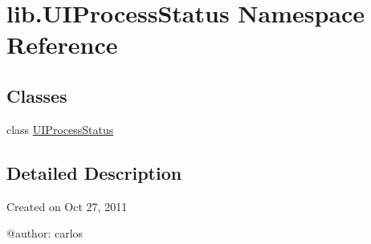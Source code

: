 \hypertarget{namespacelib_1_1_u_i_process_status}{\section{lib.\-U\-I\-Process\-Status Namespace Reference}
\label{namespacelib_1_1_u_i_process_status}
}
\subsection*{Classes}
\begin{DoxyCompactItemize}
\item 
class \hyperlink{classlib_1_1_u_i_process_status_1_1_u_i_process_status}{U\-I\-Process\-Status}
\end{DoxyCompactItemize}


\subsection{Detailed Description}
\begin{DoxyVerb}Created on Oct 27, 2011

@author: carlos
\end{DoxyVerb}
 